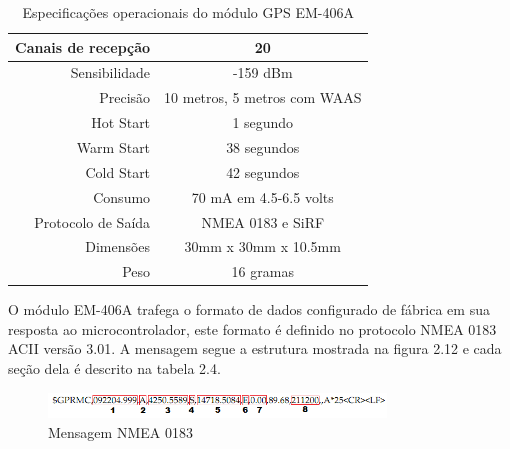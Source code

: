 \begin{table}[!h]
  \centering
	\begin{tabular}{|r|c|}
		\hline
			Canais de recepção & 20
		\\
		\hline
			Sensibilidade & -159 dBm
		\\
		\hline
			Precisão & 10 metros, 5 metros com WAAS
		\\
		\hline
		  Hot Start & 1 segundo
		\\
		\hline
			Warm Start & 38 segundos
		\\
		\hline
			Cold Start & 42 segundos
		\\
		\hline
			Consumo & 70 mA em 4.5-6.5 volts
		\\
		\hline
			Protocolo de Saída & NMEA 0183 e SiRF
		\\
		\hline
			Dimensões & 30mm x 30mm x 10.5mm
		\\
		\hline
		  Peso & 16 gramas
		\\
\hline
\end{tabular}
\caption{Especificações operacionais do módulo GPS EM-406A}
\end{table}

O módulo EM-406A trafega o formato de dados configurado de fábrica em sua resposta ao microcontrolador, este formato é definido no protocolo NMEA 0183 ACII versão 3.01. A mensagem segue a estrutura mostrada na figura 2.12 e cada seção dela é descrito na tabela 2.4.

\begin{figure}[h!]
			\centering
			\includegraphics[width=0.8\textwidth]{figures/gprmc.png}
			\caption{Mensagem NMEA 0183}
			\label{1}
\end{figure}

